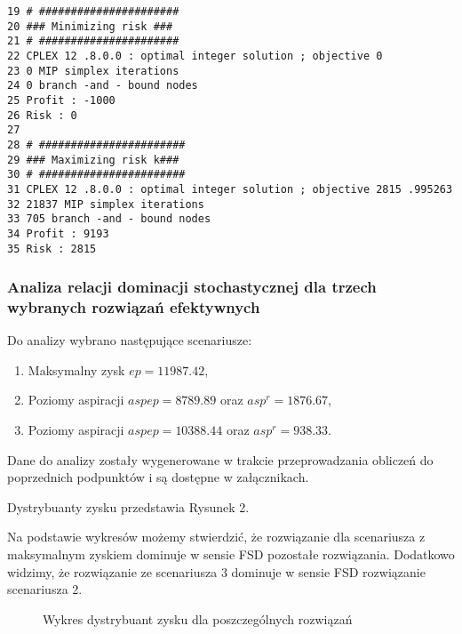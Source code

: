 \documentclass{article}
\begin{document}
\begin{verbatim}
19 # ######################
20 ### Minimizing risk ###
21 # ######################
22 CPLEX 12 .8.0.0 : optimal integer solution ; objective 0
23 0 MIP simplex iterations
24 0 branch -and - bound nodes
25 Profit : -1000
26 Risk : 0
27
28 # #######################
29 ### Maximizing risk k###
30 # #######################
31 CPLEX 12 .8.0.0 : optimal integer solution ; objective 2815 .995263
32 21837 MIP simplex iterations
33 705 branch -and - bound nodes
34 Profit : 9193
35 Risk : 2815
\end{verbatim}

\subsubsection{Analiza relacji dominacji stochastycznej dla trzech wybranych rozwiązań efektywnych}

Do analizy wybrano następujące scenariusze:

\begin{enumerate}
\item Maksymalny zysk $ep = 11987.42$,
\item Poziomy aspiracji $aspep = 8789.89$ oraz $asp^r = 1876.67$,
\item Poziomy aspiracji $aspep = 10388.44$ oraz $asp^r = 938.33$.
\end{enumerate}

Dane do analizy zostały wygenerowane w trakcie przeprowadzania obliczeń do poprzednich podpunktów i są dostępne w załącznikach.

Dystrybuanty zysku przedstawia Rysunek 2.

Na podstawie wykresów możemy stwierdzić, że rozwiązanie dla scenariusza z maksymalnym zyskiem dominuje w sensie FSD pozostałe rozwiązania. Dodatkowo widzimy, że rozwiązanie ze scenariusza 3 dominuje w sensie FSD rozwiązanie scenariusza 2.

\begin{figure}[H]
\centering
\caption{Wykres dystrybuant zysku dla poszczególnych rozwiązań}
\end{figure}
\end{document}
